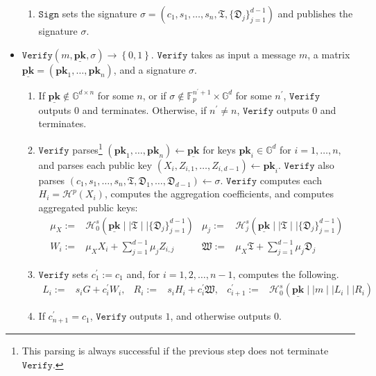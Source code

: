 \documentclass[draft]{llncs} %
\begin{document}
\begin{definition}[$d$-CLSAG]
\begin{itemize}
\begin{enumerate}
\item $\texttt{Sign}$ sets the signature $\sigma = (c_1, s_1, \ldots, s_n, \mathfrak{T}, \{\mathfrak{D}_j\}_{j=1}^{d-1})$ and publishes the signature $\sigma$.
\end{enumerate}

\item $\texttt{Verify}\left(m, \underline{\textbf{pk}}, \sigma\right) \to \left\{0,1\right\}$. $\texttt{Verify}$ takes as input a message $m$, a matrix $\underline{\textbf{pk}} = (\textbf{pk}_1, \ldots, \textbf{pk}_n)$, and a signature $\sigma$.
\begin{enumerate}
\item If $\underline{\textbf{pk}} \notin \mathbb{G}^{d \times n}$ for some $n$, or if $\sigma \notin \mathbb{F}_p^{n^\prime+1} \times \mathbb{G}^d$ for some $n^\prime$, $\texttt{Verify}$ outputs $0$ and terminates. Otherwise, if $n^\prime \neq n$, $\texttt{Verify}$ outputs $0$ and terminates.

\item $\texttt{Verify}$ parses\footnote{This parsing is always successful if the previous step does not terminate $\texttt{Verify}$.} $(\textbf{pk}_1, \ldots, \textbf{pk}_n) \leftarrow \underline{\textbf{pk}}$ for keys $\textbf{pk}_i \in \mathbb{G}^d$ for $i=1, \ldots, n$, and parses each public key $(X_i, Z_{i, 1}, \ldots, Z_{i, d-1}) \leftarrow \textbf{pk}_i$.  $\texttt{Verify}$ also parses $(c_1, s_1, \ldots, s_n, \mathfrak{T}, \mathfrak{D}_1, \ldots, \mathfrak{D}_{d - 1}) \leftarrow \sigma$. $\texttt{Verify}$ computes each $H_i = \mathcal{H}^p(X_i)$, computes the aggregation coefficients, and computes aggregated public keys:
\begin{align*}
\mu_X := & \mathcal{H}^s_0(\underline{\textbf{pk}} \mid \mid \mathfrak{T} \mid \mid \{\mathfrak{D}_j\}_{j=1}^{d-1}) & \mu_j := & \mathcal{H}^s_j(\underline{\textbf{pk}} \mid \mid \mathfrak{T} \mid \mid \{\mathfrak{D}_j\}_{j=1}^{d-1})\\
W_i :=& \mu_X X_i + \sum_{j=1}^{d-1} \mu_j Z_{i,j} & \mathfrak{W} :=& \mu_X \mathfrak{T} + \sum_{j=1}^{d-1} \mu_j \mathfrak{D}_j
\end{align*}

\item $\texttt{Verify}$ sets $c_1^\prime := c_1$ and, for $i=1, 2, \ldots, n-1$, computes the following.
\begin{align*}
L_i :=& s_i G + c_i^\prime W_i, &
R_i :=& s_i H_i + c_i^\prime\mathfrak{W}, &
c_{i+1}^\prime :=& \mathcal{H}^s_0\left(\underline{\textbf{pk}} \mid \mid m \mid \mid L_i \mid \mid R_i\right)
\end{align*}
\item If $c_{n+1}^\prime = c_1$, $\texttt{Verify}$ outputs $1$, and otherwise outputs $0$.
\end{enumerate}


\end{itemize}
\end{definition}
\end{document}
